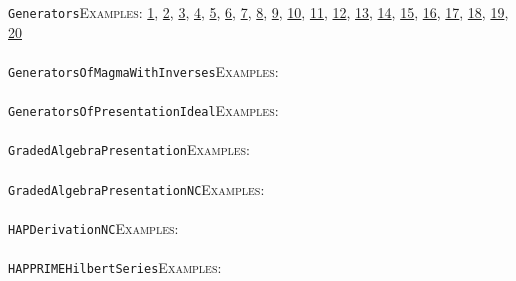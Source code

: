 \documentclass[a4paper,11pt]{report}
\begin{document}
{{ \texttt{Generators}{\nobreakspace}{\nobreakspace}{\nobreakspace}{\nobreakspace}\textsc{Examples:} \href{tutorial/chap3.html} {1}{\nobreakspace}, \href{tutorial/chap7.html} {2}{\nobreakspace}, \href{tutorial/chap8.html} {3}{\nobreakspace}, \href{tutorial/chap10.html} {4}{\nobreakspace}, \href{../www/SideLinks/About/aboutModPRings.html} {5}{\nobreakspace}, \href{../www/SideLinks/About/aboutParallel.html} {6}{\nobreakspace}, \href{../www/SideLinks/About/aboutBredon.html} {7}{\nobreakspace}, \href{../www/SideLinks/About/aboutPerformance.html} {8}{\nobreakspace}, \href{../www/SideLinks/About/aboutPeriodic.html} {9}{\nobreakspace}, \href{../www/SideLinks/About/aboutCohomologyRings.html} {10}{\nobreakspace}, \href{../www/SideLinks/About/aboutCoveringSpaces.html} {11}{\nobreakspace}, \href{../www/SideLinks/About/aboutCoverinSpaces.html} {12}{\nobreakspace}, \href{../www/SideLinks/About/aboutRandomComplexes.html} {13}{\nobreakspace}, \href{../www/SideLinks/About/aboutExtensions.html} {14}{\nobreakspace}, \href{../www/SideLinks/About/aboutSpaceGroup.html} {15}{\nobreakspace}, \href{../www/SideLinks/About/aboutFunctorial.html} {16}{\nobreakspace}, \href{../www/SideLinks/About/aboutIntro.html} {17}{\nobreakspace}, \href{../www/SideLinks/About/aboutTopology.html} {18}{\nobreakspace}, \href{../www/SideLinks/About/aboutTorAndExt.html} {19}{\nobreakspace}, \href{../www/SideLinks/About/aboutTwistedCoefficients.html} {20}{\nobreakspace} \\
 \\
 \texttt{GeneratorsOfMagmaWithInverses}{\nobreakspace}{\nobreakspace}{\nobreakspace}{\nobreakspace}\textsc{Examples:} \\
 \\
 \texttt{GeneratorsOfPresentationIdeal}{\nobreakspace}{\nobreakspace}{\nobreakspace}{\nobreakspace}\textsc{Examples:} \\
 \\
 \texttt{GradedAlgebraPresentation}{\nobreakspace}{\nobreakspace}{\nobreakspace}{\nobreakspace}\textsc{Examples:} \\
 \\
 \texttt{GradedAlgebraPresentationNC}{\nobreakspace}{\nobreakspace}{\nobreakspace}{\nobreakspace}\textsc{Examples:} \\
 \\
 \texttt{HAPDerivationNC}{\nobreakspace}{\nobreakspace}{\nobreakspace}{\nobreakspace}\textsc{Examples:} \\
 \\
 \texttt{HAPPRIME{\textunderscore}HilbertSeries}{\nobreakspace}{\nobreakspace}{\nobreakspace}{\nobreakspace}\textsc{Examples:} \\
}}
\end{document}
